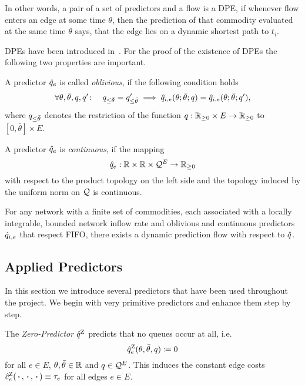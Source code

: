 In other words, a pair of a set of predictors and a flow is a DPE, if whenever flow enters an edge at some time $\theta$, then the prediction of that commodity evaluated at the same time $\theta$ says, that the edge lies on a dynamic shortest path to $t_i$.

DPEs have been introduced in~\cite{mainpaper}.
For the proof of the existence of DPEs the following two properties are important.

\begin{definition}
    A predictor $\hat q_{e}$  is called \emph{oblivious},
if the following condition holds
    \[
    \forall \theta,\bar\theta, q,q'\colon\quad
    q_{\leq \bar\theta} = q'_{\leq \bar\theta}
    \implies
    \hat q_{i,e}(\theta;\bar\theta;q)=\hat q_{i,e}(\theta;\bar\theta;q'),
    \]
    where $q_{\leq \bar\theta}$ denotes the restriction of the function $q: \mathbb{R}_{\geq 0} \times E \to \mathbb{R}_{\geq 0}$ to $[0,\bar\theta] \times E$.
\end{definition}
\begin{definition}
    A predictor $\hat q_{e}$ is \emph{continuous}, if the mapping 
    \[
        \hat q_{e}: \mathbb{R}\times \mathbb{R}\times \mathcal{Q}^E \rightarrow \mathbb{R}_{\geq0}
    \] with respect to the product topology on the left side and the topology induced by the uniform norm on $\mathcal{Q}$ is continuous.
\end{definition}

\begin{theorem}\label{thm:dpe-existence}
    For any network with a finite set of commodities, each associated with a locally integrable, bounded network inflow rate and oblivious and continuous predictors $\hat q_{i,e}$ that respect FIFO, there exists a dynamic prediction flow with respect to $\hat q$. 
\end{theorem}

\subsection{Applied Predictors}

In this section we introduce several predictors that have been used throughout the project.
We begin with very primitive predictors and enhance them step by step.


The \emph{Zero-Predictor} $\hat q^{\text{Z}}$ predicts that no queues occur at all, i.e.\[
    \hat q^{\text{Z}}_{e}(\theta, \bar\theta, q) \coloneqq 0
\]
for all $e\in E$, $\theta,\bar\theta\in\mathbb{R}$ and $q\in \mathcal{Q}^E$.
This induces the constant edge costs $\hat c^{\text{Z}}_e(\,\boldsymbol{\cdot}\,, \,\boldsymbol{\cdot}\,, \,\boldsymbol{\cdot}\,)\equiv \tau_e$ for all edges $e\in E$.

